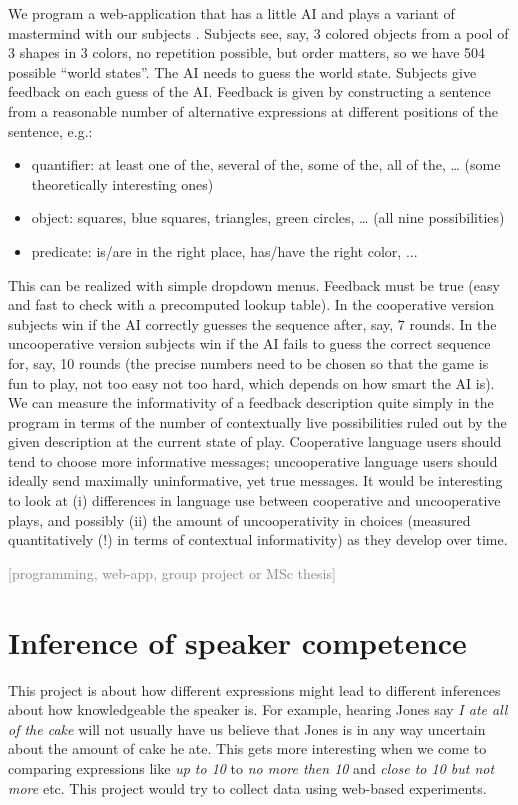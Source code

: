 \documentclass[fleqn,reqno,10pt]{article}
\newcommand{\scope}[1]{\hfill\textcolor{gray}{[#1]}}
\begin{document}
We program a web-application that has a little AI and plays a variant of mastermind with our subjects \citep[taking inspiration from][]{VerbruggeMol2008:Learning-to-App}. Subjects see, say, 3 colored objects from a pool of 3 shapes in 3 colors, no repetition possible, but order matters, so we have 504 possible ``world states''. The AI needs to guess the world state. Subjects give feedback on each guess of the AI. Feedback is given by constructing a sentence from a reasonable number of alternative expressions at different positions of the sentence, e.g.:
\begin{itemize}
\item quantifier: {at least one of the, several of the, some of the, all of the, …} (some theoretically interesting ones)
\item object: {squares, blue squares, triangles, green circles, …} (all nine possibilities)
\item predicate: {is/are in the right place, has/have the right color, ...}
\end{itemize}
This can be realized with simple dropdown menus. Feedback must be true (easy and fast to check with a precomputed lookup table). In the cooperative version subjects win if the AI correctly guesses the sequence after, say, 7 rounds. In the uncooperative version subjects win if the AI fails to guess the correct sequence for, say, 10 rounds (the precise numbers need to be chosen so that the game is fun to play, not too easy not too hard, which depends on how smart the AI is). We can measure the informativity of a feedback description quite simply in the program in terms of the number of contextually live possibilities ruled out by the given description at the current state of play. Cooperative language users should tend to choose more informative messages; uncooperative language users should ideally send maximally uninformative, yet true messages. It would be interesting to look at (i) differences in language use between cooperative and uncooperative plays, and possibly (ii) the amount of uncooperativity in choices (measured quantitatively (!) in terms of contextual informativity) as they develop over time.

\scope{programming, web-app, group project or MSc thesis}

\section{Inference of speaker competence}

This project is about how different expressions might lead to different inferences about how knowledgeable the speaker is. For example, hearing Jones say \emph{I ate all of the cake} will not usually have us believe that Jones is in any way uncertain about the amount of cake he ate. This gets more interesting when we come to comparing expressions like \emph{up to 10} to \emph{no more then 10} and \emph{close to 10 but not more} etc. This project would try to collect data using web-based experiments.
\end{document}
